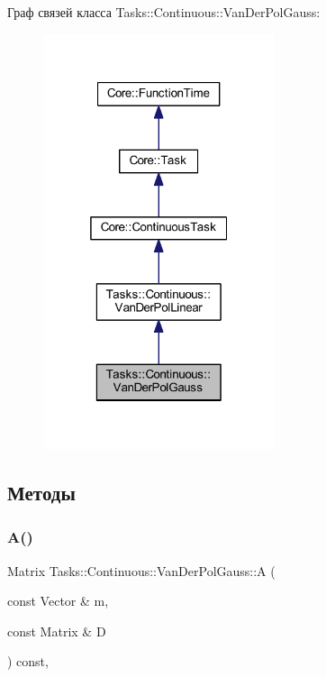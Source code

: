 Граф связей класса Tasks\+:\+:Continuous\+:\+:Van\+Der\+Pol\+Gauss\+:
\nopagebreak
\begin{figure}[H]
\begin{center}
\leavevmode
\includegraphics[width=193pt]{class_tasks_1_1_continuous_1_1_van_der_pol_gauss__coll__graph}
\end{center}
\end{figure}


\subsection{Методы}
\hypertarget{class_tasks_1_1_continuous_1_1_van_der_pol_gauss_a2ef625f7f8c590726c5b52e67622c172}{}\label{class_tasks_1_1_continuous_1_1_van_der_pol_gauss_a2ef625f7f8c590726c5b52e67622c172} 
\subsubsection{\texorpdfstring{A()}{A()}}
{\footnotesize\ttfamily Matrix Tasks\+::\+Continuous\+::\+Van\+Der\+Pol\+Gauss\+::A (\begin{DoxyParamCaption}\item[{const Vector \&}]{m,  }\item[{const Matrix \&}]{D }\end{DoxyParamCaption}) const\hspace{0.3cm}{\ttfamily [override]}, {\ttfamily [virtual]}}



